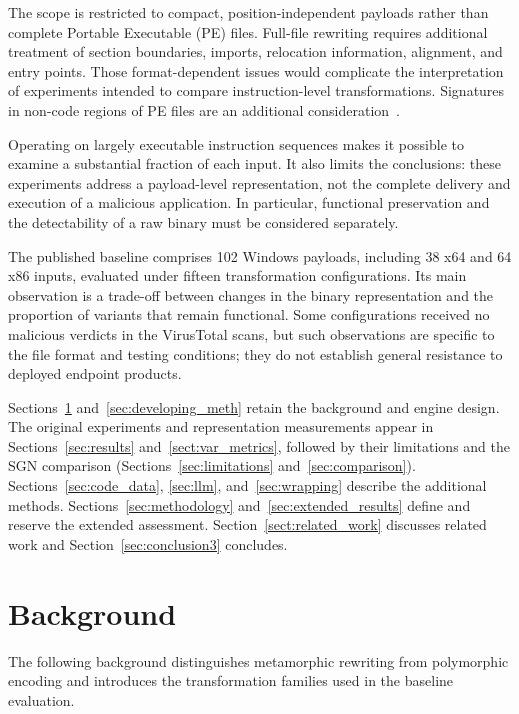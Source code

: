 \documentclass[runningheads]{llncs}
\begin{document}
The scope is restricted to compact, position-independent payloads rather than complete Portable Executable (PE) files. Full-file rewriting requires additional treatment of section boundaries, imports, relocation information, alignment, and entry points. Those format-dependent issues would complicate the interpretation of experiments intended to compare instruction-level transformations. Signatures in non-code regions of PE files are an additional consideration~\cite{sigdetPEnoncode}.

Operating on largely executable instruction sequences makes it possible to examine a substantial fraction of each input. It also limits the conclusions: these experiments address a payload-level representation, not the complete delivery and execution of a malicious application. In particular, functional preservation and the detectability of a raw binary must be considered separately.

The published baseline comprises 102 Windows payloads, including 38 x64 and 64 x86 inputs, evaluated under fifteen transformation configurations. Its main observation is a trade-off between changes in the binary representation and the proportion of variants that remain functional. Some configurations received no malicious verdicts in the VirusTotal scans, but such observations are specific to the file format and testing conditions; they do not establish general resistance to deployed endpoint products.

Sections~\ref{sec:background} and~\ref{sec:developing_meth} retain
the background and engine design. The original experiments and
representation measurements appear in Sections~\ref{sec:results}
and~\ref{sect:var_metrics}, followed by their limitations and the SGN
comparison (Sections~\ref{sec:limitations} and~\ref{sec:comparison}).
Sections~\ref{sec:code_data}, \ref{sec:llm}, and~\ref{sec:wrapping}
describe the additional methods. Sections~\ref{sec:methodology}
and~\ref{sec:extended_results} define and reserve the extended
assessment. Section~\ref{sect:related_work} discusses related work and
Section~\ref{sec:conclusion3} concludes.

\section{Background}\label{sec:background}

The following background distinguishes metamorphic rewriting from polymorphic encoding and introduces the transformation families used in the baseline evaluation.
\end{document}
